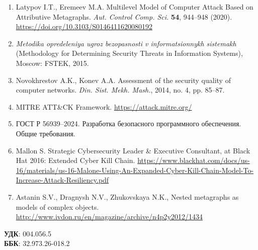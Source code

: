 \documentclass[12pt,a4paper]{extarticle}
\begin{document}
\begin{enumerate}
    \item Latypov I.T., Eremeev M.A. Multilevel Model of Computer Attack Based on Attributive Metagraphs. \textit{Aut. Control Comp. Sci.} \textbf{54}, 944–948 (2020). \url{https://doi.org/10.3103/S0146411620080192}
    \item \textit{Metodika opredeleniya ugroz bezopasnosti v informatsionnykh sistemakh} (Methodology for Determining Security Threats in Information Systems), Moscow: FSTEK, 2015.
    \item Novokhrestov A.K., Konev A.A. Assessment of the security quality of computer networks. \textit{Din. Sist. Mekh. Mash.}, 2014, no. 4, pp. 85–87.
    \item MITRE ATT\&CK Framework. \url{https://attack.mitre.org/}
    \item ГОСТ Р 56939–2024. Разработка безопасного программного обеспечения. Общие требования.
    \item Mallon S. Strategic Cybersecurity Leader \& Executive Consultant, at Black Hat 2016: Extended Cyber Kill Chain. \url{https://www.blackhat.com/docs/us-16/materials/us-16-Malone-Using-An-Expanded-Cyber-Kill-Chain-Model-To-Increase-Attack-Resiliency.pdf}
    \item Astanin S.V., Dragnysh N.V., Zhukovskaya N.K., Nested metagraphs as models of complex objects. \url{http://www.ivdon.ru/en/magazine/archive/n4p2y2012/1434}
\end{enumerate}

\vspace{1em}
\noindent\textbf{УДК}: 004.056.5 \\
\textbf{ББК}: 32.973.26-018.2
\end{document}
